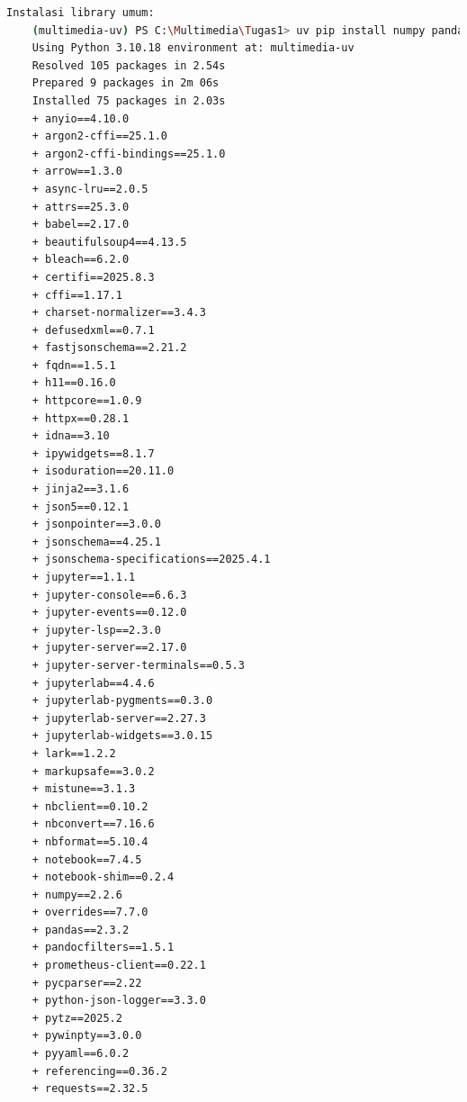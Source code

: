 \documentclass[11pt,a4paper]{article}
\begin{document}
\begin{itemize}
\begin{lstlisting}[language=bash, caption=Instalasi library umum]
Instalasi library umum:
    (multimedia-uv) PS C:\Multimedia\Tugas1> uv pip install numpy pandas jupyter
    Using Python 3.10.18 environment at: multimedia-uv
    Resolved 105 packages in 2.54s                                                                                                                                   
    Prepared 9 packages in 2m 06s
    Installed 75 packages in 2.03s
    + anyio==4.10.0                                                                                                                                                 
    + argon2-cffi==25.1.0                                                                                                                                           
    + argon2-cffi-bindings==25.1.0                                                                                                                                  
    + arrow==1.3.0                                                                                                                                                  
    + async-lru==2.0.5                                                                                                                                              
    + attrs==25.3.0                                                                                                                                                 
    + babel==2.17.0
    + beautifulsoup4==4.13.5
    + bleach==6.2.0
    + certifi==2025.8.3
    + cffi==1.17.1
    + charset-normalizer==3.4.3
    + defusedxml==0.7.1
    + fastjsonschema==2.21.2
    + fqdn==1.5.1
    + h11==0.16.0
    + httpcore==1.0.9
    + httpx==0.28.1
    + idna==3.10
    + ipywidgets==8.1.7
    + isoduration==20.11.0
    + jinja2==3.1.6
    + json5==0.12.1
    + jsonpointer==3.0.0
    + jsonschema==4.25.1
    + jsonschema-specifications==2025.4.1
    + jupyter==1.1.1
    + jupyter-console==6.6.3
    + jupyter-events==0.12.0
    + jupyter-lsp==2.3.0
    + jupyter-server==2.17.0
    + jupyter-server-terminals==0.5.3
    + jupyterlab==4.4.6
    + jupyterlab-pygments==0.3.0
    + jupyterlab-server==2.27.3
    + jupyterlab-widgets==3.0.15
    + lark==1.2.2
    + markupsafe==3.0.2
    + mistune==3.1.3
    + nbclient==0.10.2
    + nbconvert==7.16.6
    + nbformat==5.10.4
    + notebook==7.4.5
    + notebook-shim==0.2.4
    + numpy==2.2.6
    + overrides==7.7.0
    + pandas==2.3.2
    + pandocfilters==1.5.1
    + prometheus-client==0.22.1
    + pycparser==2.22
    + python-json-logger==3.3.0
    + pytz==2025.2
    + pywinpty==3.0.0
    + pyyaml==6.0.2
    + referencing==0.36.2
    + requests==2.32.5

\end{lstlisting}
\end{itemize}
\end{document}
